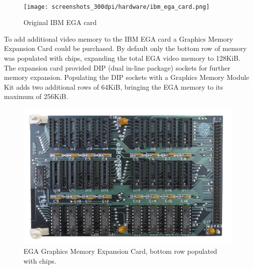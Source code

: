 \documentclass[book.tex]{subfiles}
\begin{document}
\\


\begin{figure}[H]
  \centering 
  \texttt{[image: screenshots\_300dpi/hardware/ibm\_ega\_card.png]} 
  \caption{Original IBM EGA card}
  \label{fig:ibm_ega_card}
\end{figure}

\par
To add additional video memory to the IBM EGA card a Graphics Memory Expansion Card could be purchased. By default only the bottom row of memory was populated with chips, expanding the total EGA video memory to 128KiB. The expansion card provided DIP (dual in-line package) sockets for further memory expansion. Populating the DIP sockets with a Graphics Memory Module Kit adds two additional rows of 64KiB, bringing the EGA memory to its maximum of 256KiB. \\


\begin{figure}[H]
  \centering 
  \includegraphics[width=1.0\textwidth]{screenshots_300dpi/hardware/ibm_ega_graphics_memory_expansion_card.png} 
  \caption{EGA Graphics Memory Expansion Card, bottom row populated with chips.}
  \label{fig:ibm_ega_card}
\end{figure}
\end{document}
